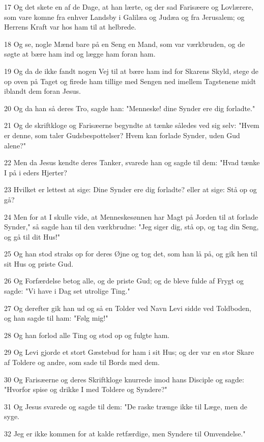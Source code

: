\par 17 Og det skete en af de Dage, at han lærte, og der sad Farisæere og Lovlærere, som vare komne fra enhver Landsby i Galilæa og Judæa og fra Jerusalem; og Herrens Kraft var hos ham til at helbrede.
\par 18 Og se, nogle Mænd bare på en Seng en Mand, som var værkbruden, og de søgte at bære ham ind og lægge ham foran ham.
\par 19 Og da de ikke fandt nogen Vej til at bære ham ind for Skarens Skyld, stege de op oven på Taget og firede ham tillige med Sengen ned imellem Tagstenene midt iblandt dem foran Jesus.
\par 20 Og da han så deres Tro, sagde han: "Menneske! dine Synder ere dig forladte."
\par 21 Og de skriftkloge og Farisæerne begyndte at tænke således ved sig selv: "Hvem er denne, som taler Gudsbespottelser? Hvem kan forlade Synder, uden Gud alene?"
\par 22 Men da Jesus kendte deres Tanker, svarede han og sagde til dem: "Hvad tænke I på i eders Hjerter?
\par 23 Hvilket er lettest at sige: Dine Synder ere dig forladte? eller at sige: Stå op og gå?
\par 24 Men for at I skulle vide, at Menneskesønnen har Magt på Jorden til at forlade Synder," så sagde han til den værkbrudne: "Jeg siger dig, stå op, og tag din Seng, og gå til dit Hus!"
\par 25 Og han stod straks op for deres Øjne og tog det, som han lå på, og gik hen til sit Hus og priste Gud.
\par 26 Og Forfærdelse betog alle, og de priste Gud; og de bleve fulde af Frygt og sagde: "Vi have i Dag set utrolige Ting."
\par 27 Og derefter gik han ud og så en Tolder ved Navn Levi sidde ved Toldboden, og han sagde til ham: "Følg mig!"
\par 28 Og han forlod alle Ting og stod op og fulgte ham.
\par 29 Og Levi gjorde et stort Gæstebud for ham i sit Hus; og der var en stor Skare af Toldere og andre, som sade til Bords med dem.
\par 30 Og Farisæerne og deres Skriftkloge knurrede imod hans Disciple og sagde: "Hvorfor spise og drikke I med Toldere og Syndere?"
\par 31 Og Jesus svarede og sagde til dem: "De raske trænge ikke til Læge, men de syge.
\par 32 Jeg er ikke kommen for at kalde retfærdige, men Syndere til Omvendelse."
